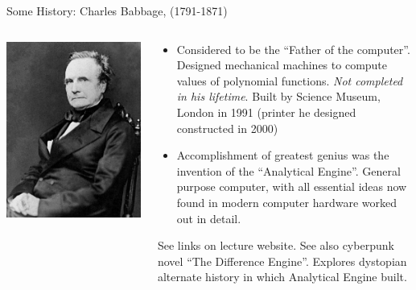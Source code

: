 \documentclass[aspectratio=169]{beamer}
\newcommand{\mypause}{}
\newcommand{\cramplist}{
	\setlength{\itemsep}{0in}
	\setlength{\partopsep}{0in}
	\setlength{\topsep}{0in}}
\begin{document}
\begin{frame}{Some History: Charles Babbage, (1791-1871)}
  \begin{columns}
    
    \begin{column}{0.4\linewidth}
      \includegraphics[width=\linewidth]{Charles_Babbage-1860.jpg}
    \end{column}

    \begin{column}{0.6\linewidth}
      \begin{itemize}\cramplist
      \item Considered to be the ``Father of the computer''. Designed
        mechanical machines to compute values of polynomial
        functions. \emph{Not completed in his lifetime}. Built by
        Science Museum, London in 1991 (printer he designed
        constructed in 2000)
        \mypause%
      \item Accomplishment of greatest genius was the invention of the
        ``Analytical Engine''. General purpose computer, with all
        essential ideas now found in modern computer hardware worked
        out in detail.
      \end{itemize}
      See links on lecture website. See also cyberpunk novel ``The
      Difference Engine''. Explores dystopian alternate history in
      which Analytical Engine built.
    \end{column}
  \end{columns}
\end{frame}
\end{document}

